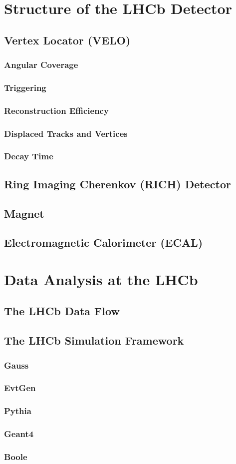 \section{Structure of the LHCb Detector}
\subsection{Vertex Locator (VELO)}
\subsubsection{Angular Coverage}
\subsubsection{Triggering}
\subsubsection{Reconstruction Efficiency}
\subsubsection{Displaced Tracks and Vertices}
\subsubsection{Decay Time}
\subsection{Ring Imaging Cherenkov (RICH) Detector}
\subsection{Magnet} 
\subsection{Electromagnetic Calorimeter (ECAL)}
\section{Data Analysis at the LHCb}
\subsection{The LHCb Data Flow}
\subsection{The LHCb Simulation Framework}
\subsubsection{Gauss}
\subsubsection{EvtGen}
\subsubsection{Pythia}
\subsubsection{Geant4}
\subsubsection{Boole} 



